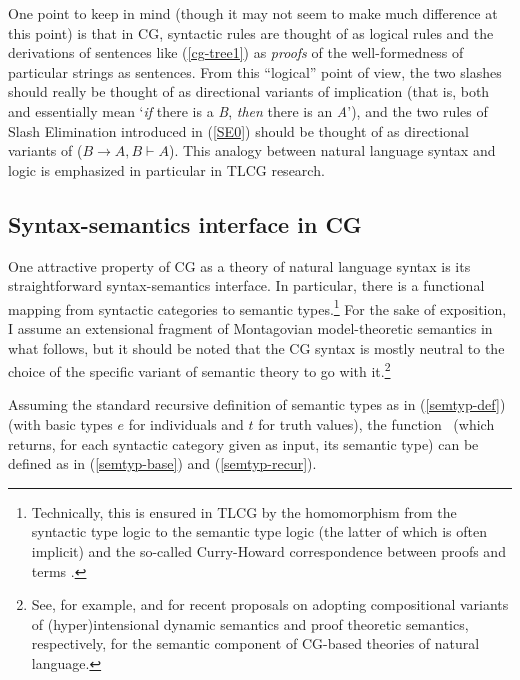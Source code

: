 \documentclass[output=paper
                ,modfonts
 	        ,biblatex
                ,babelshorthands
                ,newtxmath
                ,draftmode
                ,colorlinks, citecolor=brown
]{langscibook}
\begin{document}
One point to keep in mind (though it may not seem to make much
difference at this point) is that in CG, syntactic rules are
thought of as logical rules and the derivations of sentences like
(\ref{cg-tree1}) as \emph{proofs} of the well-formedness of
particular strings as sentences.
From this ``logical'' point of view, the two slashes should really be
thought of as directional variants of implication (that is, both
 and  essentially mean `\emph{if} there is a \textit{B},
\emph{then} there is an \textit{A}'), and the two rules of Slash Elimination
introduced in (\ref{SE0})
should be thought of as directional variants of 
($B \ensuremath{ \rightarrow } A, B  \ensuremath{\vdash\xspace } A$). This analogy between natural language
syntax and logic is emphasized in particular in TLCG research.


\subsection{Syntax-semantics interface in CG \label{interface}}

One attractive property of CG as a theory of natural language syntax
is its straightforward syntax-semantics
interface. In particular, there is a 
functional mapping from syntactic categories to semantic
types.\footnote{Technically, this is ensured in TLCG by the 
homomorphism from the syntactic type logic to the semantic type logic
(the latter of which is often implicit) and the so-called Curry-Howard
correspondence between proofs and terms \citep{vanBenthem88}.}
For the sake of exposition, I assume an extensional fragment of
Montagovian model-theoretic semantics in what follows, but it should be noted that the
CG syntax is mostly neutral to the choice of the specific variant of
semantic theory to go with it.\footnote{See,  for example,  \citet{martin2013} and
\citet{bekkimineshima17} for recent proposals on adopting compositional variants
of (hyper)intensional dynamic semantics and proof theoretic semantics,
respectively, for the semantic component of CG-based theories of
natural language.}

Assuming the standard recursive definition of semantic types
as in (\ref{semtyp-def}) (with basic types $e$ for
individuals and $t$ for truth values), the function \SemTyp\ (which returns, for each
syntactic category given as input, its semantic type) can be defined as in
(\ref{semtyp-base}) and (\ref{semtyp-recur}).
\end{document}
